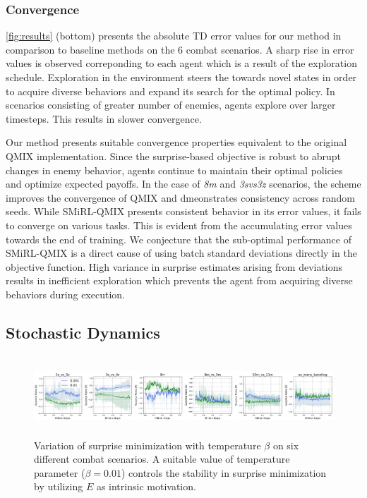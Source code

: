 \documentclass{article}
\begin{document}
\begin{multicols}{2}
\subsubsection{Convergence}
\autoref{fig:results} (bottom) presents the absolute TD error values for our method in comparison to baseline methods on the 6 combat scenarios. A sharp rise in error values is observed correponding to each agent which is a result of the exploration schedule. Exploration in the environment steers the towards novel states in order to acquire diverse behaviors and expand its search for the optimal policy. In scenarios consisting of greater number of enemies, agents explore over larger timesteps. This results in slower convergence. 

Our method presents suitable convergence properties equivalent to the original QMIX implementation. Since the surprise-based objective is robust to abrupt changes in enemy behavior, agents continue to maintain their optimal policies and optimize expected payoffs. In the case of \textit{8m} and \textit{3s\textunderscore vs\textunderscore 3z} scenarios, the scheme improves the convergence of QMIX and dmeonstrates consistency across random seeds. While SMiRL-QMIX presents consistent behavior in its error values, it fails to converge on various tasks. This is evident from the accumulating error values towards the end of training. We conjecture that the sub-optimal performance of SMiRL-QMIX is a direct cause of using batch standard deviations directly in the objective function. High variance in surprise estimates arising from deviations results in inefficient exploration which prevents the agent from acquiring diverse behaviors during execution. 

\subsection{Stochastic Dynamics}
\begin{figure}[ht]
  \centering
  \includegraphics[height=3cm,width=20cm]{surprise.png}
  \caption{Variation of surprise minimization with temperature $\beta$ on six different combat scenarios. A suitable value of temperature parameter ($\beta=0.01$) controls the stability in surprise minimization by utilizing $E$ as intrinsic motivation.}
  \label{fig:ablations}
\end{figure}


\end{multicols}
\end{document}
